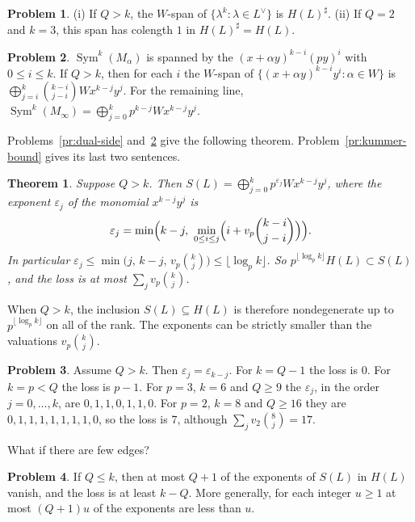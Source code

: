 \documentclass[reqno]{amsart}
\theoremstyle{definition}
\newtheorem{problem}{Problem}[section]
\theoremstyle{plain}
\newtheorem{theorem}{Theorem}[section]
\newcommand{\Sym}{\operatorname{Sym}}
\begin{document}
\begin{problem}\label{pr:powers}
(i) If \(Q > k\), the \(W\)-span of \(\{\lambda^k : \lambda \in L^\vee\}\) is \(H(L)^\sharp\).  (ii) If \(Q = 2\) and \(k = 3\), this span has colength \(1\) in \(H(L)^\sharp = H(L)\).
\end{problem}

\begin{problem}\label{pr:span-i}
\(\Sym^k(M_\alpha)\) is spanned by the \((x + \alpha y)^{k-i}(py)^i\) with \(0 \le i \le k\).  If \(Q > k\), then for each \(i\) the \(W\)-span of \(\{(x + \alpha y)^{k-i} y^i : \alpha \in W\}\) is \(\bigoplus_{j=i}^k \binom{k-i}{j-i} W x^{k-j} y^j\).  For the remaining line, \(\Sym^k(M_\infty) = \bigoplus_{j=0}^k p^{k-j} W x^{k-j} y^j\).
\end{problem}

Problems~\ref{pr:dual-side} and~\ref{pr:span-i} give the following theorem.  Problem~\ref{pr:kummer-bound} gives its last two sentences.

\begin{theorem}\label{thm:vertex}
Suppose \(Q > k\).  Then \(S(L) = \bigoplus_{j=0}^k p^{\varepsilon_j} W x^{k-j} y^j\), where the exponent \(\varepsilon_j\) of the monomial \(x^{k-j}y^j\) is
\[
  \varepsilon_j = \min\Bigl(k - j,\ \min_{0 \le i \le j} \Bigl(i + v_p\binom{k-i}{j-i}\Bigr)\Bigr) .
\]
In particular \(\varepsilon_j \le \min\bigl(j,\, k-j,\, v_p\binom kj\bigr) \le \lfloor \log_p k \rfloor\).  So \(p^{\lfloor \log_p k \rfloor} H(L) \subset S(L)\), and the loss is at most \(\sum_j v_p\binom kj\).
\end{theorem}

When \(Q > k\), the inclusion \(S(L) \subseteq H(L)\) is therefore nondegenerate up to \(p^{\lfloor \log_p k \rfloor}\) on all of the rank.  The exponents can be strictly smaller than the valuations \(v_p\binom kj\).

\begin{problem}\label{pr:check}
Assume \(Q > k\).  Then \(\varepsilon_j = \varepsilon_{k-j}\).  For \(k = Q - 1\) the loss is \(0\).  For \(k = p < Q\) the loss is \(p - 1\).  For \(p = 3\), \(k = 6\) and \(Q \ge 9\) the \(\varepsilon_j\), in the order \(j = 0, \dots, k\), are \(0, 1, 1, 0, 1, 1, 0\).  For \(p = 2\), \(k = 8\) and \(Q \ge 16\) they are \(0, 1, 1, 1, 1, 1, 1, 1, 0\), so the loss is \(7\), although \(\sum_j v_2\binom 8j = 17\).
\end{problem}

What if there are few edges?

\begin{problem}\label{pr:few-edges}
If \(Q \le k\), then at most \(Q + 1\) of the exponents of \(S(L)\) in \(H(L)\) vanish, and the loss is at least \(k - Q\).  More generally, for each integer \(u \ge 1\) at most \((Q+1)u\) of the exponents are less than \(u\).
\end{problem}
\end{document}
